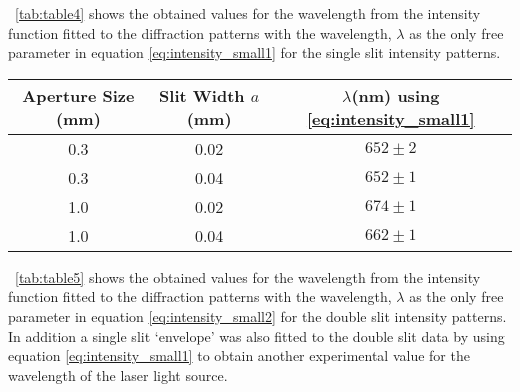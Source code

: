 \documentclass{article}
\newcommand{\tabref}[2][\tablename~]{#1\ref{#2}}
\begin{document}
\clearpage
\vspace{2mm}
\noindent
\tabref{tab:table4} shows the obtained values for the wavelength from the intensity function fitted to the diffraction patterns with the wavelength, $\lambda$ as the only free parameter in equation \eqref{eq:intensity_small1} for the single slit intensity patterns.

\vspace{5mm}
\begin{table*}[h]
\centering %
\caption{Table of experimental values for the wavelength, $\lambda$ of the laser light source by using a non-linear least squares fit to the data with equation \eqref{eq:intensity_small1} for the single slit intensity patterns.}
\label{tab:table4}
\begin{tabular}{|c|c|c|}
\hline
Aperture Size (mm) & Slit Width $a$(mm) & $\lambda$(nm) using \eqref{eq:intensity_small1} \\
\hline
0.3 & 0.02 & $652 \pm 2$ \\
\hline
0.3 & 0.04 & $652 \pm 1$ \\
\hline
1.0 & 0.02 & $674 \pm 1$ \\
\hline
1.0 & 0.04 & $662 \pm 1$ \\
\hline
\end{tabular}
\end{table*}

\vspace{2mm}
\noindent
\tabref{tab:table5} shows the obtained values for the wavelength from the intensity function fitted to the diffraction patterns with the wavelength, $\lambda$ as the only free parameter in equation \eqref{eq:intensity_small2} for the double slit intensity patterns. In addition a single slit `envelope' was also fitted to the double slit data by using equation \eqref{eq:intensity_small1} to obtain another experimental value for the wavelength of the laser light source.
\end{document}
